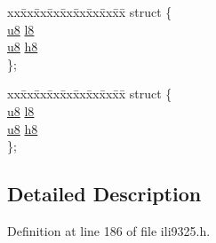 \begin{DoxyCompactItemize}
\begin{tabbing}
\end{tabbing}\item 
\begin{tabbing}
xx\=xx\=xx\=xx\=xx\=xx\=xx\=xx\=xx\=\kill
struct \{\\
\>\hyperlink{p8_2pinguino_2core_2typedef_8h_aed742c436da53c1080638ce6ef7d13de}{u8} \hyperlink{unionword__t_a533455d8a4ec318e7144be4c1b6b9af3}{l8}\\
\>\hyperlink{p8_2pinguino_2core_2typedef_8h_aed742c436da53c1080638ce6ef7d13de}{u8} \hyperlink{unionword__t_adcad4dc69be4c39d2fb6307f0cb97ac1}{h8}\\
\}; \\

\end{tabbing}\item 
\begin{tabbing}
xx\=xx\=xx\=xx\=xx\=xx\=xx\=xx\=xx\=\kill
struct \{\\
\>\hyperlink{p8_2pinguino_2core_2typedef_8h_aed742c436da53c1080638ce6ef7d13de}{u8} \hyperlink{unionword__t_a533455d8a4ec318e7144be4c1b6b9af3}{l8}\\
\>\hyperlink{p8_2pinguino_2core_2typedef_8h_aed742c436da53c1080638ce6ef7d13de}{u8} \hyperlink{unionword__t_adcad4dc69be4c39d2fb6307f0cb97ac1}{h8}\\
\}; \\

\end{tabbing}\end{DoxyCompactItemize}


\subsection{Detailed Description}


Definition at line 186 of file ili9325.\-h.



